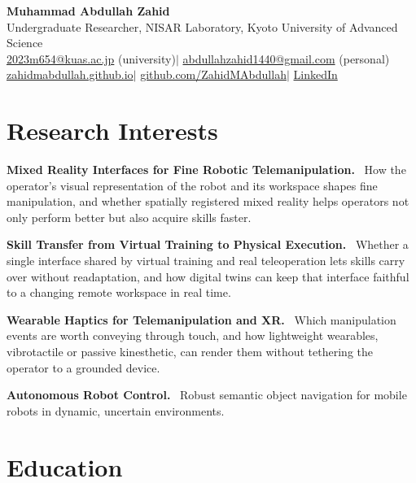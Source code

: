 \documentclass[11pt,a4paper]{article}
\let\cvorigsection\section
\renewcommand{\section}[1]{\Needspace{6\baselineskip}\cvorigsection{#1}}
\newcommand{\lab}[1]{\textbf{#1}\ }
\begin{document}
\begin{center}
  {\LARGE\bfseries Muhammad Abdullah Zahid}\\[4pt]
  Undergraduate Researcher, NISAR Laboratory, Kyoto University of Advanced Science\\[3pt]
  \href{mailto:2023m654@kuas.ac.jp}{2023m654@kuas.ac.jp} (university)\quad$|$\quad
  \href{mailto:abdullahzahid1440@gmail.com}{abdullahzahid1440@gmail.com} (personal)\\[2pt]
  \href{https://zahidmabdullah.github.io}{zahidmabdullah.github.io}\quad$|$\quad
  \href{https://github.com/ZahidMAbdullah}{github.com/ZahidMAbdullah}\quad$|$\quad
  \href{https://www.linkedin.com/in/muhammad-abdullah-zahid-3b5a1226a/}{LinkedIn}
\end{center}

\section{Research Interests}

\lab{Mixed Reality Interfaces for Fine Robotic Telemanipulation.} How the operator's visual
representation of the robot and its workspace shapes fine manipulation, and whether spatially registered
mixed reality helps operators not only perform better but also acquire skills faster.

\vspace{4pt}
\lab{Skill Transfer from Virtual Training to Physical Execution.} Whether a single interface shared by
virtual training and real teleoperation lets skills carry over without readaptation, and how digital
twins can keep that interface faithful to a changing remote workspace in real time.

\vspace{4pt}
\lab{Wearable Haptics for Telemanipulation and XR.} Which manipulation events are worth conveying
through touch, and how lightweight wearables, vibrotactile or passive kinesthetic, can render them
without tethering the operator to a grounded device.

\vspace{4pt}
\lab{Autonomous Robot Control.} Robust semantic object navigation for mobile robots in dynamic,
uncertain environments.

\section{Education}
\end{document}
